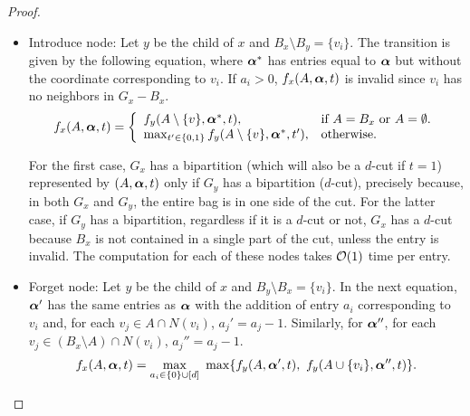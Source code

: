 \begin{proof}
\begin{itemize}
        \item Introduce node: Let $y$ be the child of $x$ and $B_x \setminus B_y = \{v_i\}$.
        The transition is given by the following equation, where $\boldsymbol{\alpha}^*$ has entries equal to $\boldsymbol{\alpha}$ but without the coordinate corresponding to $v_i$.
        If $a_i > 0$, $f_x(A, \boldsymbol{\alpha}, t)$ is invalid since $v_i$ has no neighbors in $G_x - B_x$.
        \[
     f_x(A, \boldsymbol{\alpha}, t)=\left\{
                \begin{array}{ll}
                  f_y(A \setminus \{v\}, \boldsymbol{\alpha}^*, t), & \text{if $A = B_x$ or $A = \emptyset$.}\\
                  \max_{t' \in \{0,1\}} f_y(A \setminus \{v\}, \boldsymbol{\alpha}^*, t'), & \text{otherwise.}
                \end{array}
              \right.
       \]

        For the first case, $G_x$ has a bipartition (which will also be a $d$-cut if $t=1$)  represented by $(A, \boldsymbol{\alpha}, t)$ only if $G_y$ has a bipartition ($d$-cut), precisely because, in both $G_x$ and $G_y$, the entire bag is in one side of the cut.
        For the latter case, if $G_y$ has a bipartition, regardless if it is a $d$-cut or not, $G_x$ has a $d$-cut %
        because $B_x$ is not contained in a single part of the cut, unless the entry is invalid.
        The computation for each of these nodes takes $\mathcal{O}\!\left(1\right)$ time per entry.

        \item Forget node: Let $y$ be the child of $x$ and $B_y \setminus B_x = \{v_i\}$.
        In the next equation, $\boldsymbol{\alpha}'$ has the same entries as $\boldsymbol{\alpha}$ with the addition of entry $a_i$ corresponding to $v_i$ and, for each $v_j \in A \cap N(v_i)$, $a_j' = a_j - 1$.
        Similarly, for $\boldsymbol{\alpha}''$, for each $v_j \in (B_x \setminus A) \cap N(v_i)$, $a_j'' = a_j - 1$.
        \begin{equation*}
            f_x(A, \boldsymbol{\alpha}, t) = \max_{a_i \in \{0\} \cup [d]}\ \max \{ f_y(A, \boldsymbol{\alpha}', t),\  f_y(A \cup \{v_i\}, \boldsymbol{\alpha}'', t)\}.
        \end{equation*}


\end{itemize}
\end{proof}
